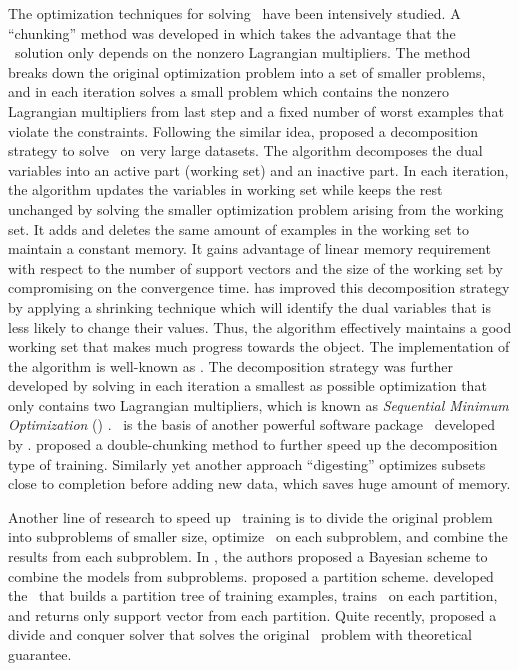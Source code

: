 {\iffalse
The optimization techniques for solving \svm\ have been intensively studied.
A ``chunking'' method was developed in \citep{Vapnik82estimation} which takes the advantage that the \svm\ solution only depends on the nonzero Lagrangian multipliers.
The method breaks down the original optimization problem into a set of smaller problems, and in each iteration solves a small problem which contains the nonzero Lagrangian multipliers from last step and a fixed number of worst examples that violate the constraints.
Following the similar idea, \citet{Osuna97an} proposed a decomposition strategy to solve \svm\ on very large datasets.
The algorithm decomposes the dual variables into an active part (working set) and an inactive part.
In each iteration, the algorithm updates the variables in working set while keeps the rest unchanged by solving the smaller optimization problem arising from the working set.
It adds and deletes the same amount of examples in the working set to maintain a constant memory.
It gains advantage of linear memory requirement with respect to the number of support vectors and the size of the working set by compromising on the convergence time.
\citet{Joachims98making} has improved this decomposition strategy by applying a shrinking technique which will identify the dual variables that is less likely to change their values.
Thus, the algorithm effectively maintains a good working set that makes much progress towards the object.
The implementation of the algorithm is well-known as \svmlight.
The decomposition strategy was further developed by solving in each iteration a smallest as possible optimization that only contains two Lagrangian multipliers, which is known as \textit{Sequential Minimum Optimization} (\smo) \citep{Platt98sequential,Platt99fast}.
\smo\ is the basis of another powerful software package \libsvm\ developed by \citet{Chang11libsvm}.
\citet{Perezcruz04double} proposed a double-chunking method to further speed up the decomposition type of training. 
Similarly yet another approach ``digesting'' \citep{Decoste02support} optimizes subsets close to completion before adding new data, which saves huge amount of memory.

Another line of research to speed up \svm\ training is to divide the original problem into subproblems of smaller size, optimize \svm\ on each subproblem, and combine the results from each subproblem.
In \citep{Tresp00a,Schwaighofer01the}, the authors proposed a Bayesian scheme to combine the models from subproblems.
\citet{Collobert02a} proposed a partition scheme.
\citet{Graf05parallel} developed the \svmcascade\ that builds a partition tree of training examples, trains \svm\ on each partition, and returns only support vector from each partition.
Quite recently, \citet{Hsieh14a} proposed a divide and conquer solver that solves the original \svm\ problem with theoretical guarantee.

}
